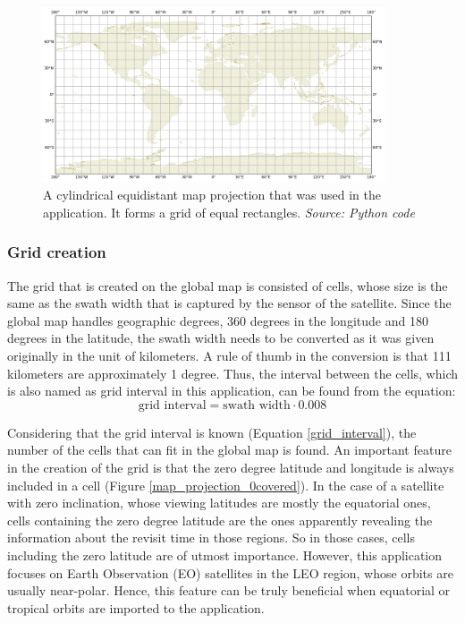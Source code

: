 \begin{figure}
\centering
\includegraphics[width=0.9\textwidth]{Images/map_projection.png}\caption{A cylindrical equidistant map projection that was used in the application. It forms a grid of equal rectangles. \textit{Source: Python code}}
\label{map_projection}
\end{figure}

\bigskip
\subsubsection{Grid creation}
\bigskip

The grid that is created on the global map is consisted of cells, whose size is the same as the swath width that is captured by the sensor of the satellite. Since the global map handles geographic degrees, 360 degrees in the longitude and 180 degrees in the latitude, the swath width needs to be converted as it was given originally in the unit of kilometers. A rule of thumb in the conversion is that 111 kilometers are approximately 1 degree. Thus, the interval between the cells, which is also named as grid interval in this application, can be found from the equation:
\begin{equation}
\label{grid_interval}
\text{grid interval} = \text{swath width} \cdot 0.008
\end{equation}

Considering that the grid interval is known (Equation \ref{grid_interval}), the number of the cells that can fit in the global map is found. An important feature in the creation of the grid is that the zero degree latitude and longitude is always included in a cell (Figure \ref{map_projection_0covered}). In the case of a satellite with zero inclination, whose viewing latitudes are mostly the equatorial ones, cells containing the zero degree latitude are the ones apparently revealing the information about the revisit time in those regions. So in those cases, cells including the zero latitude are of utmost importance. However, this application focuses on Earth Observation (EO) satellites in the LEO region, whose orbits are usually near-polar. Hence, this feature can be truly beneficial when equatorial or tropical orbits are imported to the application.

